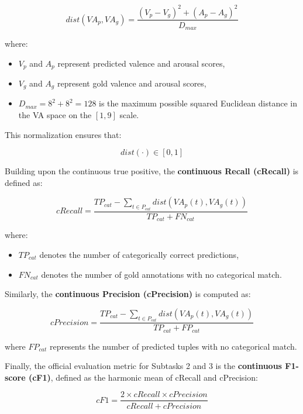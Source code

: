 \documentclass{article}
\begin{document}
\begin{equation}
dist(VA_p, VA_g)=
\frac{
(V_p - V_g)^2 + (A_p - A_g)^2
}{D_{max}}
\end{equation}

where:
\begin{itemize}
    \item $V_p$ and $A_p$ represent predicted valence and arousal scores,
    \item $V_g$ and $A_g$ represent gold valence and arousal scores,
    \item $D_{max} = 8^2 + 8^2 = 128$ is the maximum possible squared Euclidean distance in the VA space on the $[1,9]$ scale.
\end{itemize}

This normalization ensures that:

\begin{equation}
dist(\cdot) \in [0,1]
\end{equation}

Building upon the continuous true positive, the \textbf{continuous Recall (cRecall)} is defined as:

\begin{equation}
cRecall =
\frac{
TP_{cat} -
\sum_{t \in P_{cat}}
dist(VA_p(t), VA_g(t))
}{
TP_{cat} + FN_{cat}
}
\end{equation}

where:
\begin{itemize}
    \item $TP_{cat}$ denotes the number of categorically correct predictions,
    \item $FN_{cat}$ denotes the number of gold annotations with no categorical match.
\end{itemize}

Similarly, the \textbf{continuous Precision (cPrecision)} is computed as:

\begin{equation}
cPrecision =
\frac{
TP_{cat} -
\sum_{t \in P_{cat}}
dist(VA_p(t), VA_g(t))
}{
TP_{cat} + FP_{cat}
}
\end{equation}

where $FP_{cat}$ represents the number of predicted tuples with no categorical match.

Finally, the official evaluation metric for Subtasks 2 and 3 is the \textbf{continuous F1-score (cF1)}, defined as the harmonic mean of cRecall and cPrecision:

\begin{equation}
cF1 =
\frac{
2 \times cRecall \times cPrecision
}{
cRecall + cPrecision
}
\end{equation}
\end{document}
